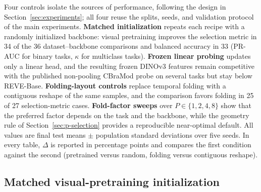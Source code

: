 Four controls isolate the sources of performance, following the design in
Section~\ref{sec:experiments}; all four reuse the splits, seeds, and validation
protocol of the main experiments. \textbf{Matched initialization} repeats each
recipe with a randomly initialized backbone: visual pretraining improves the
selection metric in 34 of the 36 dataset--backbone comparisons and balanced
accuracy in 33 (PR-AUC for binary tasks, $\kappa$ for multiclass tasks).
\textbf{Frozen linear probing} updates only a linear head, and the
resulting frozen DINOv3 features remain competitive with the published
non-pooling CBraMod probe on several tasks but stay below REVE-Base.
\textbf{Folding-layout controls} replace temporal folding with a contiguous
reshape of the same samples, and the comparison favors folding in 25 of 27
selection-metric cases. \textbf{Fold-factor sweeps} over $P\in\{1,2,4,8\}$ show that the
preferred factor depends on the task and the backbone, while the geometry rule
of Section~\ref{sec:p-selection} provides a reproducible near-optimal default.
All values are final test means $\pm$ population standard deviations over five
seeds. In every table, $\Delta$ is reported in percentage points and compares
the first condition against the second (pretrained versus random, folding
versus contiguous reshape).

\subsection{Matched visual-pretraining initialization}\label{app:pretraining-full-generated}\label{app:complete-ablations}




\FloatBarrier

